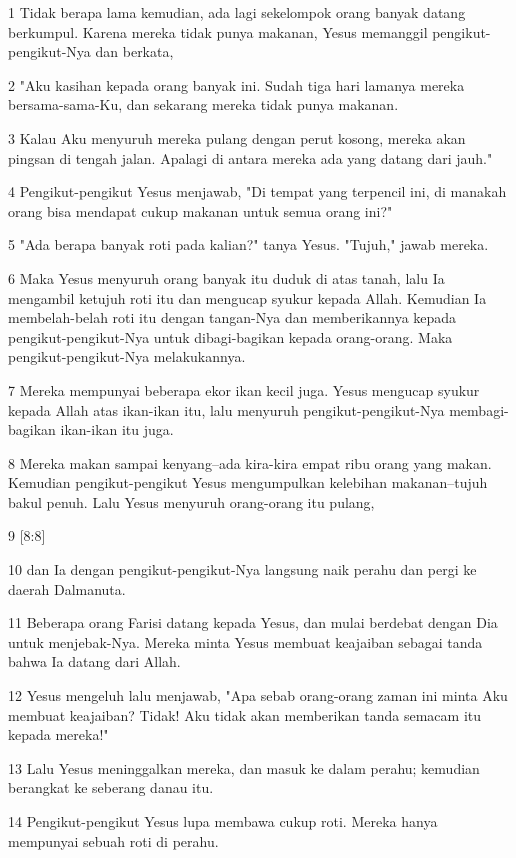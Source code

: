 \par 1 Tidak berapa lama kemudian, ada lagi sekelompok orang banyak datang berkumpul. Karena mereka tidak punya makanan, Yesus memanggil pengikut-pengikut-Nya dan berkata,
\par 2 "Aku kasihan kepada orang banyak ini. Sudah tiga hari lamanya mereka bersama-sama-Ku, dan sekarang mereka tidak punya makanan.
\par 3 Kalau Aku menyuruh mereka pulang dengan perut kosong, mereka akan pingsan di tengah jalan. Apalagi di antara mereka ada yang datang dari jauh."
\par 4 Pengikut-pengikut Yesus menjawab, "Di tempat yang terpencil ini, di manakah orang bisa mendapat cukup makanan untuk semua orang ini?"
\par 5 "Ada berapa banyak roti pada kalian?" tanya Yesus. "Tujuh," jawab mereka.
\par 6 Maka Yesus menyuruh orang banyak itu duduk di atas tanah, lalu Ia mengambil ketujuh roti itu dan mengucap syukur kepada Allah. Kemudian Ia membelah-belah roti itu dengan tangan-Nya dan memberikannya kepada pengikut-pengikut-Nya untuk dibagi-bagikan kepada orang-orang. Maka pengikut-pengikut-Nya melakukannya.
\par 7 Mereka mempunyai beberapa ekor ikan kecil juga. Yesus mengucap syukur kepada Allah atas ikan-ikan itu, lalu menyuruh pengikut-pengikut-Nya membagi-bagikan ikan-ikan itu juga.
\par 8 Mereka makan sampai kenyang--ada kira-kira empat ribu orang yang makan. Kemudian pengikut-pengikut Yesus mengumpulkan kelebihan makanan--tujuh bakul penuh. Lalu Yesus menyuruh orang-orang itu pulang,
\par 9 [8:8]
\par 10 dan Ia dengan pengikut-pengikut-Nya langsung naik perahu dan pergi ke daerah Dalmanuta.
\par 11 Beberapa orang Farisi datang kepada Yesus, dan mulai berdebat dengan Dia untuk menjebak-Nya. Mereka minta Yesus membuat keajaiban sebagai tanda bahwa Ia datang dari Allah.
\par 12 Yesus mengeluh lalu menjawab, "Apa sebab orang-orang zaman ini minta Aku membuat keajaiban? Tidak! Aku tidak akan memberikan tanda semacam itu kepada mereka!"
\par 13 Lalu Yesus meninggalkan mereka, dan masuk ke dalam perahu; kemudian berangkat ke seberang danau itu.
\par 14 Pengikut-pengikut Yesus lupa membawa cukup roti. Mereka hanya mempunyai sebuah roti di perahu.
